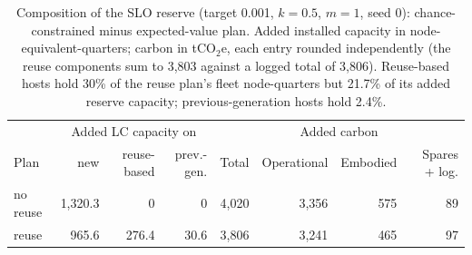 \documentclass{article} %
\begin{document}
\begin{table}[h]
\caption{Monte Carlo replay of expected-value plans (headroom multiplier 3): LC capacity shortfall risk over 72 region-quarters.}
\label{tab:ev_risk}
\begin{center}
\small
{}
\end{center}
\end{table}

\begin{table}[h]
\caption{Composition of the SLO reserve (target 0.001, $k=0.5$, $m=1$, seed 0): chance-constrained minus expected-value plan. Added installed capacity in node-equivalent-quarters; carbon in tCO$_2$e, each entry rounded independently (the reuse components sum to 3,803 against a logged total of 3,806). Reuse-based hosts hold 30\% of the reuse plan's fleet node-quarters but 21.7\% of its added reserve capacity; previous-generation hosts hold 2.4\%.}
\label{tab:composition}
\begin{center}
\small
\begin{tabular}{lrrrrrrr}
\toprule
 & \multicolumn{3}{c}{Added LC capacity on} & \multicolumn{4}{c}{Added carbon} \\
Plan & new & reuse-based & prev.-gen. & Total & Operational & Embodied & Spares + log. \\
\midrule
no reuse & 1,320.3 & 0 & 0 & 4,020 & 3,356 & 575 & 89 \\
reuse & 965.6 & 276.4 & 30.6 & 3,806 & 3,241 & 465 & 97 \\
\bottomrule
\end{tabular}
\end{center}
\end{table}
\end{document}
